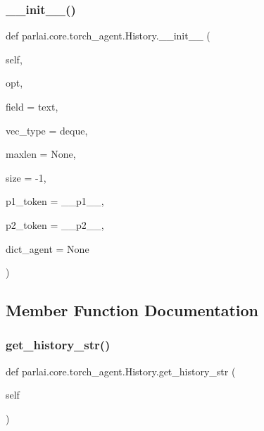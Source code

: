 \subsubsection{\texorpdfstring{\+\_\+\+\_\+init\+\_\+\+\_\+()}{\_\_init\_\_()}}
{\footnotesize\ttfamily def parlai.\+core.\+torch\+\_\+agent.\+History.\+\_\+\+\_\+init\+\_\+\+\_\+ (\begin{DoxyParamCaption}\item[{}]{self,  }\item[{}]{opt,  }\item[{}]{field = {\ttfamily \textquotesingle{}text\textquotesingle{}},  }\item[{}]{vec\+\_\+type = {\ttfamily \textquotesingle{}deque\textquotesingle{}},  }\item[{}]{maxlen = {\ttfamily None},  }\item[{}]{size = {\ttfamily -\/1},  }\item[{}]{p1\+\_\+token = {\ttfamily \textquotesingle{}\+\_\+\+\_\+p1\+\_\+\+\_\+\textquotesingle{}},  }\item[{}]{p2\+\_\+token = {\ttfamily \textquotesingle{}\+\_\+\+\_\+p2\+\_\+\+\_\+\textquotesingle{}},  }\item[{}]{dict\+\_\+agent = {\ttfamily None} }\end{DoxyParamCaption})}



\subsection{Member Function Documentation}
\mbox{\label{classparlai_1_1core_1_1torch__agent_1_1History_a29576ee0dd27b8ee5e651297dada3131}} 
\subsubsection{\texorpdfstring{get\+\_\+history\+\_\+str()}{get\_history\_str()}}
{\footnotesize\ttfamily def parlai.\+core.\+torch\+\_\+agent.\+History.\+get\+\_\+history\+\_\+str (\begin{DoxyParamCaption}\item[{}]{self }\end{DoxyParamCaption})}

